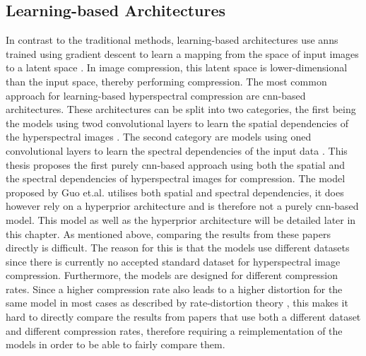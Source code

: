 \subsection{Learning-based Architectures}
In contrast to the traditional methods, learning-based architectures use \acp{ann} trained using gradient descent to learn a mapping from the space of input images to a latent space \citep{ruder_overview_2017}. In image compression, this latent space is lower-dimensional than the input space, thereby performing compression. 
The most common approach for learning-based hyperspectral compression are \ac{cnn}-based architectures. These architectures can be split into two categories, the first being the models using \ac{twod} convolutional layers to learn the spatial dependencies of the hyperspectral images \citep{la_grassa_hyperspectral_2022}. The second category are models using \ac{oned} convolutional layers to learn the spectral dependencies of the input data \citep{kuester_1d-convolutional_2021,kuester_transferability_2022}. This thesis proposes the first purely \ac{cnn}-based approach using both the spatial and the spectral dependencies of hyperspectral images for compression. The model proposed by Guo et.al. \citep{guo_learned_2021} utilises both spatial and spectral dependencies, it does however rely on a hyperprior architecture and is therefore not a purely \ac{cnn}-based model. This model as well as the hyperprior architecture will be detailed later in this chapter.
As mentioned above, comparing the results from these papers directly is difficult. The reason for this is that the models use different datasets since there is currently no accepted standard dataset for hyperspectral image compression. Furthermore, the models are designed for different compression rates. Since a higher compression rate also leads to a higher distortion for the same model in most cases as described by rate-distortion theory \citep{berger_rate-distortion_2003}, this makes it hard to directly compare the results from papers that use both a different dataset and different compression rates, therefore requiring a reimplementation of the models in order to be able to fairly compare them.

